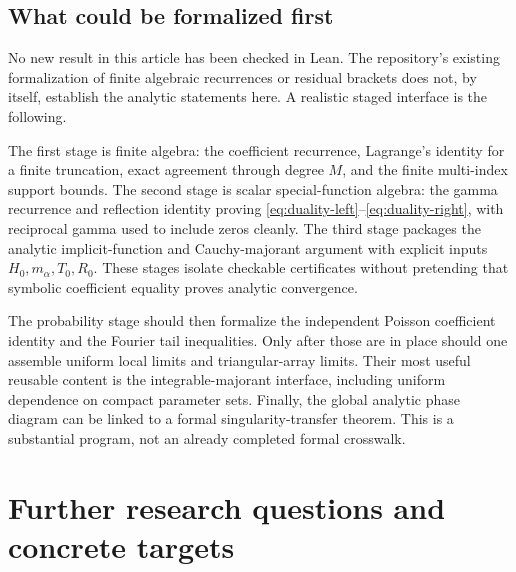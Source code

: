 \documentclass[11pt,a4paper]{article}
\numberwithin{equation}{section}
\theoremstyle{definition}
\theoremstyle{remark}
\begin{document}
\subsection{What could be formalized first}
No new result in this article has been checked in Lean. The repository's
existing formalization of finite algebraic recurrences or residual
brackets does not, by itself, establish the analytic statements here.
A realistic staged interface is the following.

The first stage is finite algebra: the coefficient recurrence,
Lagrange's identity for a finite truncation, exact agreement through
degree $M$, and the finite multi-index support bounds. The second stage
is scalar special-function algebra: the gamma recurrence and reflection
identity proving \eqref{eq:duality-left}--\eqref{eq:duality-right}, with
reciprocal gamma used to include zeros cleanly. The third stage packages
the analytic implicit-function and Cauchy-majorant argument with explicit
inputs $H_0,m_\alpha,T_0,R_0$. These stages isolate checkable certificates
without pretending that symbolic coefficient equality proves analytic
convergence.

The probability stage should then formalize the independent Poisson
coefficient identity and the Fourier tail inequalities. Only after
those are in place should one assemble uniform local limits and
triangular-array limits. Their most useful reusable content is the
integrable-majorant interface, including uniform dependence on compact
parameter sets. Finally, the global analytic phase diagram can be linked
to a formal singularity-transfer theorem. This is a substantial program,
not an already completed formal crosswalk.

\section{Further research questions and concrete targets}
\label{sec:questions}
\end{document}

